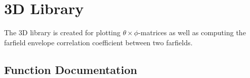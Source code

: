 \section{3D Library}

The 3D library is created for plotting $\theta \times \phi$-matrices as well as computing the farfield envelope correlation coefficient between two farfields.

\subsection{Function Documentation}


